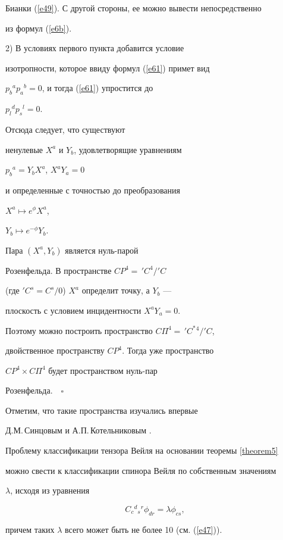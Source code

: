Бианки (\ref{e49}). С другой стороны, ее можно вывести непосредственно


из формул (\ref{e6b}).





2) В условиях первого пункта добавится условие


изотропности, которое ввиду формул (\ref{e61}) примет вид


$p_b{}^a p_a{}^b=0$, и тогда (\ref{e61}) упростится до


$p_l{}^d p_s{}^l=0$.


Отсюда следует, что существуют


ненулевые $X^a$ и $Y_b$, удовлетворящие уравнениям


$p_b{}^a=Y_bX^a$, $X^aY_a=0$


и определенные с точностью до преобразования


$X^a\longmapsto e^\phi X^a$,


$Y_b\longmapsto e^{-\phi} Y_b$.


Пара $(X^a,Y_b)$ является нуль-парой


Розенфельда. В пространстве $CP^4=\,{}'C^4/'C$


(где $'C^s=C^s/{0}$) $X^a$ определит точку, а $Y_b$ ---


плоскость с условием инцидентности $X^aY_a=0$.


Поэтому можно построить пространство $C\varPi^4=\,{}'C^*{}^4/'C$,


двойственное пространству $CP^4$. Тогда уже пространство


$CP^4\times C\varPi^4$ будет пространством нуль-пар


Розенфельда.$\quad\square$


\medskip





Отметим, что такие пространства изучались впервые


Д.М.\,Синцовым \cite{Sin1} и А.П.\,Котельнико\-вым \cite{Kot1}.





\begin{note}


\label{note2}


Проблему классификации тензора Вейля на основании теоремы \ref{theorem5}


можно свести к классификации спинора Вейля по собственным значениям


$\lambda$, исходя из уравнения


$$


C_c{}^d{}_s{}^r \phi_{dr}=\lambda \phi_{cs},


$$


причем таких $\lambda$ всего может быть не более 10 (см. (\ref{e47})).


\end{note}





